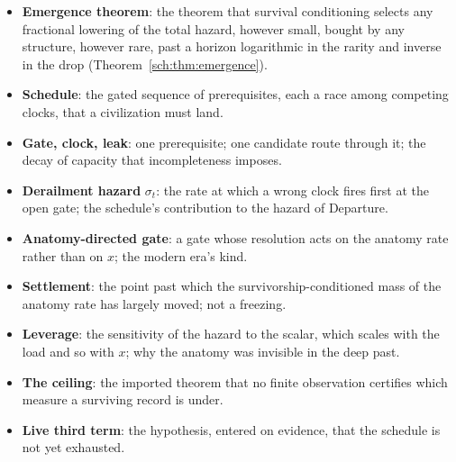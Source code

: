 \begin{itemize}[itemsep=2pt]
as any successful lowering of the total hazard of departure, its
external, internal and schedule channels together.
\item \textbf{Emergence theorem}: the theorem that survival
conditioning selects any fractional lowering of the total hazard,
however small, bought by any structure, however rare, past a horizon
logarithmic in the rarity and inverse in the drop
(Theorem~\ref{sch:thm:emergence}).
\item \textbf{Schedule}: the gated sequence of prerequisites, each a race
among competing clocks, that a civilization must land.
\item \textbf{Gate, clock, leak}: one prerequisite; one candidate route
through it; the decay of capacity that incompleteness imposes.
\item \textbf{Derailment hazard} $\sigma_t$: the rate at which a wrong
clock fires first at the open gate; the schedule's contribution to the
hazard of Departure.
\item \textbf{Anatomy-directed gate}: a gate whose resolution acts on
the anatomy rate rather than on $x$; the modern era's kind.
\item \textbf{Settlement}: the point past which the survivorship-conditioned
mass of the anatomy rate has largely moved; not a freezing.
\item \textbf{Leverage}: the sensitivity of the hazard to the scalar,
which scales with the load and so with $x$; why the anatomy was
invisible in the deep past.
\item \textbf{The ceiling}: the imported theorem that no finite
observation certifies which measure a surviving record is under.
\item \textbf{Live third term}: the hypothesis, entered on evidence, that
the schedule is not yet exhausted.
\end{itemize}

